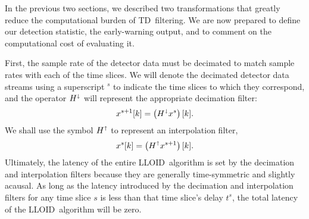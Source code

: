 \documentclass[preprint2]{aastex}
\newcommand{\lloid}{LLOID}%
\newcommand{\TD}{TD}%
\begin{document}
In the previous two sections, we described two transformations that greatly
reduce the computational burden of \TD\ filtering.  We are now prepared to
define our detection statistic, the early-warning output, and to comment on the
computational cost of evaluating it.

First, the sample rate of the detector data must be decimated to match sample
rates with each of the time slices.  We will denote the decimated detector data
streams using a superscript $^s$ to indicate the time slices to which they
correspond, and the operator $H^\shortdownarrow$ will represent the appropriate
decimation filter:
\begin{equation*}
\label{eq:decomp}
	x^{s+1}[k] = \left( H^\shortdownarrow x^s\right)[k].
\end{equation*}
We shall use the symbol $H^\shortuparrow$ to represent an interpolation filter,
\begin{equation*}
	x^{s}[k] = \left( H^\shortuparrow x^{s+1}\right)[k].
\end{equation*}
Ultimately, the latency of the entire \lloid\ algorithm is set by the decimation
and interpolation filters because they are generally time-symmetric and slightly
acausal.  As long as the latency introduced by the decimation and interpolation
filters for any time slice $s$ is less than that time slice's delay $t^s$, the
total latency of the \lloid\ algorithm will be zero.
\end{document}
